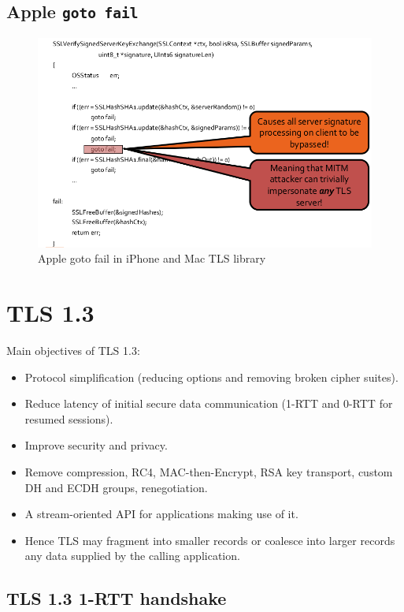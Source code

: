 \documentclass[11pt,oneside,a4paper]{article}
\begin{document}
\subsection{Apple \texttt{goto fail}}

\begin{figure}[hb]
	\centering
	\includegraphics[width=0.5\linewidth]{figures/apple_goto_fail}
	\caption{Apple goto fail in iPhone and Mac TLS library}
	\label{fig:applegotofail}
\end{figure}

\section{TLS 1.3}

Main objectives of TLS 1.3:

\vspace{-\topsep}
\begin{itemize}
	\setlength{\itemsep}{0pt}
	\setlength{\parskip}{0pt}
	\item Protocol simplification (reducing options and removing broken cipher suites).
	\item Reduce latency of initial secure data communication (1-RTT and 0-RTT for resumed sessions).
	\item Improve security and privacy.
	\item Remove compression, RC4, MAC-then-Encrypt, RSA key transport,	custom DH and ECDH groups, renegotiation.
	\item A stream-oriented API for applications making use of it.
	\item Hence TLS may fragment into smaller records or coalesce into larger records any data supplied by the calling application.
\end{itemize}
\vspace{-\topsep}

\subsection{TLS 1.3 1-RTT handshake}
\end{document}
